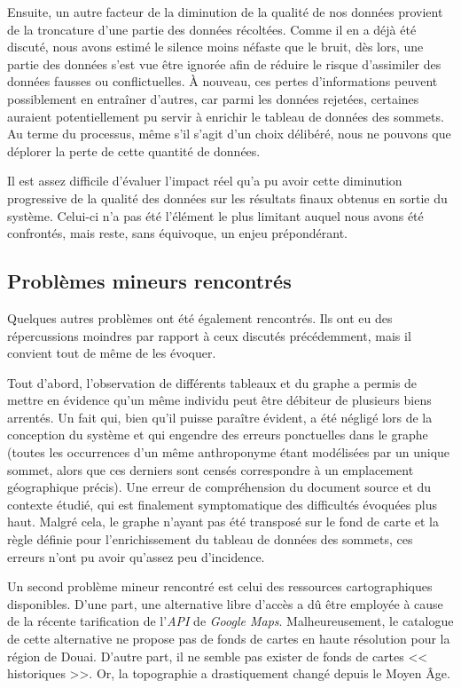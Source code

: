 Ensuite, un autre facteur de la diminution de la  qualité de nos données provient de la troncature d'une partie des données récoltées. Comme il en a déjà été discuté, nous avons estimé le silence moins néfaste que le bruit, dès lors, une partie des données s'est vue être ignorée afin de réduire le risque d'assimiler des données fausses ou conflictuelles. À nouveau, ces pertes d'informations peuvent possiblement en entraîner d'autres, car parmi les données rejetées, certaines auraient potentiellement pu servir à enrichir le tableau de données des sommets. Au terme du processus, même s'il s'agit d'un choix délibéré, nous ne pouvons que déplorer la perte de cette quantité de données.

Il est assez difficile d'évaluer l'impact réel qu'a pu avoir cette diminution progressive de la qualité des données sur les résultats finaux obtenus en sortie du système. Celui-ci n'a pas été l'élément le plus limitant auquel nous avons été confrontés, mais reste,  sans équivoque, un enjeu prépondérant.

\subsection{Problèmes mineurs rencontrés}

Quelques autres problèmes ont été également rencontrés. Ils ont eu des répercussions moindres par rapport à ceux discutés précédemment, mais il convient tout de même de les évoquer.

Tout d'abord, l'observation de différents tableaux et du graphe a permis de mettre en évidence  qu'un même individu peut être débiteur de plusieurs biens arrentés. Un fait qui, bien qu'il puisse paraître évident, a été négligé lors de la conception du système et qui engendre des erreurs ponctuelles dans le graphe (toutes les occurrences d'un même anthroponyme étant modélisées par un unique sommet, alors que ces derniers sont censés correspondre à un emplacement géographique précis).
Une erreur de compréhension du document source et du contexte étudié, qui est finalement  symptomatique des difficultés évoquées plus haut.
Malgré cela, le graphe n'ayant pas été transposé sur le fond de carte et la règle définie pour l'enrichissement du tableau de données des sommets, ces erreurs n'ont pu avoir qu’assez peu d'incidence. 

Un second problème mineur rencontré est celui des ressources cartographiques disponibles. D'une part, une alternative libre d'accès a dû être employée à cause de la récente tarification de l'\textit{API} de \textit{Google Maps}. Malheureusement, le catalogue de cette alternative ne propose pas de fonds de cartes en haute résolution pour la région de Douai. D'autre part, il ne semble pas exister de fonds de cartes << historiques >>. Or, la topographie a drastiquement changé depuis le Moyen Âge.